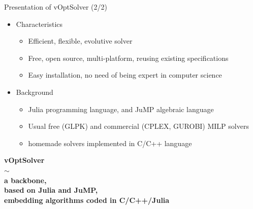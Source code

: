 \documentclass[10pt,xcolor=dvipsnames]{beamer}
\begin{document}
\begin{frame}{Presentation of vOptSolver (2/2)}

\begin{itemize}
%
%
%

\item Characteristics

\begin{itemize}
    \item Efficient, flexible, evolutive solver
    \item Free, open source, multi-platform, reusing existing specifications
    \item Easy installation, no need of being expert in computer science
\end{itemize}
\medskip

\item Background

\begin{itemize}
    \item Julia programming language, and JuMP algebraic language
    \item Usual free (GLPK) and commercial (CPLEX, GUROBI) MILP solvers
    \item homemade solvers implemented in C/C++ language 
\end{itemize}

\end{itemize}

\begin{center}
\textbf{
 vOptSolver\\ $\sim$\\ a backbone, \\  based on Julia and JuMP, \\ embedding algorithms coded in C/C++/Julia
 }
\end{center}
\end{frame}
\end{document}

